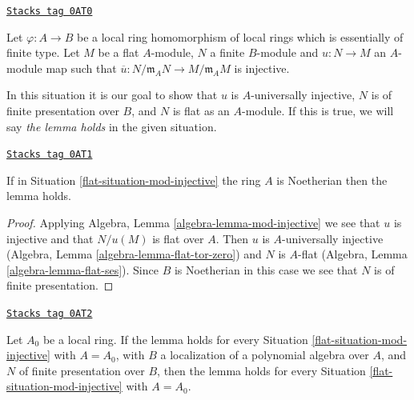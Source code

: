 \begin{definition}
\label{flat-situation-mod-injective}
\href{https://stacks.math.columbia.edu/tag/0AT0}{\texttt{Stacks tag 0AT0}}

Let $\varphi : A \to B$ be a local ring homomorphism of local rings
which is essentially of finite type. Let $M$ be a flat $A$-module,
$N$ a finite $B$-module and $u : N \to M$ an $A$-module map such that
$\overline{u} : N/\mathfrak m_AN \to M/\mathfrak m_AM$ is injective.
\end{definition}

In this situation it is our goal to show that $u$ is $A$-universally injective,
$N$ is of finite presentation over $B$, and $N$ is flat as an $A$-module.
If this is true, we will say {\it the lemma holds} in the given situation.

\begin{lemma}
\label{flat-lemma-Noetherian-finite-type-injective-into-flat-mod-m}
\href{https://stacks.math.columbia.edu/tag/0AT1}{\texttt{Stacks tag 0AT1}}

If in Situation \ref{flat-situation-mod-injective} the ring $A$ is Noetherian
then the lemma holds.
\end{lemma}

\begin{proof}
Applying Algebra, Lemma \ref{algebra-lemma-mod-injective} we see that
$u$ is injective and that $N/u(M)$ is flat over $A$. Then $u$ is
$A$-universally injective
(Algebra, Lemma \ref{algebra-lemma-flat-tor-zero}) and $N$ is $A$-flat
(Algebra, Lemma \ref{algebra-lemma-flat-ses}). Since $B$ is Noetherian
in this case we see that $N$ is of finite presentation.
\end{proof}

\begin{lemma}
\label{flat-lemma-reduce-finite-type-injective-into-flat-mod-m}
\href{https://stacks.math.columbia.edu/tag/0AT2}{\texttt{Stacks tag 0AT2}}

Let $A_0$ be a local ring. If the lemma holds for every
Situation \ref{flat-situation-mod-injective} with $A = A_0$, with $B$ a
localization of a polynomial algebra over $A$, and $N$ of finite presentation
over $B$, then the lemma holds for every
Situation \ref{flat-situation-mod-injective} with $A = A_0$.
\end{lemma}

